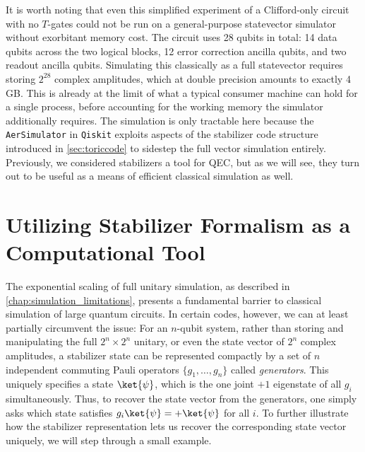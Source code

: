 It is worth noting that even this simplified experiment of a Clifford-only circuit with no $T$-gates could not be run on a general-purpose statevector simulator without exorbitant memory cost. The circuit uses 28 qubits in total: 14 data qubits across the two logical blocks, 12 error correction ancilla qubits, and two readout ancilla qubits. Simulating this classically as a full statevector requires storing $2^{28}$ complex amplitudes, which at double precision amounts to exactly 4\,GB. This is already at the limit of what a typical consumer machine can hold for a single process, before accounting for the working memory the simulator additionally requires. The simulation is only tractable here because the \texttt{AerSimulator} in \texttt{Qiskit} exploits aspects of the stabilizer code structure introduced in \cref{sec:toriccode} to sidestep the full vector simulation entirely. Previously, we considered stabilizers a tool for QEC, but as we will see, they turn out to be useful as a means of efficient classical simulation as well.

\section{Utilizing Stabilizer Formalism as a Computational Tool}\label{sec:stabilizers_in_computation}
The exponential scaling of full unitary simulation, as described in \cref{chap:simulation_limitations}, presents a fundamental barrier to classical simulation of large quantum circuits. In certain codes, however, we can at least partially circumvent the issue: For an $n$-qubit system, rather than storing and manipulating the full $2^n \times 2^n$ unitary, or even the state vector of $2^n$ complex amplitudes, a stabilizer state can be represented compactly by a set of $n$ independent commuting Pauli operators $\{g_1, \ldots, g_n\}$ called \emph{generators}. This uniquely specifies a state $\ket{\psi}$, which is the one joint $+1$ eigenstate of all $g_i$ simultaneously. Thus, to recover the state vector from the generators, one simply asks which state satisfies $g_i\ket{\psi} = +\ket{\psi}$ for all $i$. To further illustrate how the stabilizer representation lets us recover the corresponding state vector uniquely, we will step through a small example.

